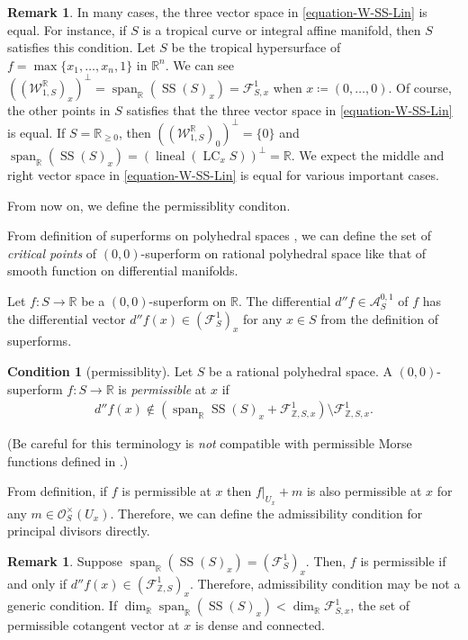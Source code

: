 \documentclass[a4paper,dvipdfmx,reqno,12pt]{amsart}
\theoremstyle{definition}
\newtheorem{remark}[theorem]{Remark}
\newtheorem{condition}[theorem]{Condition}
\newcommand{\deq}{\coloneqq}
\newcommand{\opn}[1]{\operatorname{#1}}
\numberwithin{equation}{section}
\begin{document}
\begin{remark}
In many cases, the three vector space in 
\cref{equation-W-SS-Lin} is equal.
For instance, if $S$ is a tropical curve 
or integral affine manifold, 
then $S$ satisfies this condition.
Let $S$ be the tropical hypersurface of
$f=\max\{x_1,\ldots,x_n,1\}$ in $\mathbb{R}^{n}$. 
We can see
$((\mathcal{W}_{1,S}^{\mathbb{R}})_{x})^{\bot}=\opn{span}_{{\mathbb{R}}}(\opn{SS}(S)_x)=\mathcal{F}_{S,x}^{1}$
when $x\deq (0,\ldots,0)$. 
Of course, the other points in $S$ satisfies 
that the three vector space in 
\cref{equation-W-SS-Lin} is equal. If 
$S=\mathbb{R}_{\geq 0}$, then 
$((\mathcal{W}_{1,S}^{\mathbb{R}})_{0})^{\bot}=\{0\}$ and
$\opn{span}_{\mathbb{R}}(\opn{SS}(S)_x)=
(\opn{lineal}(\opn{LC}_x S))^{\bot}=\mathbb{R}$. 
We expect the middle and right vector space in 
\cref{equation-W-SS-Lin} is equal for various 
important cases.
\end{remark}

From now on, we define the permissiblity conditon.

From definition of superforms on 
polyhedral spaces 
\cite[Definition 2.10, 2.24]{MR3903579}, we 
can define the set of \emph{critical points} 
of $(0,0)$-superform on rational polyhedral space
like that of smooth function on differential
manifolds.


Let $f\colon S \to \mathbb{R}$ be a $(0,0)$-superform on 
$\mathbb{R}$. The differential $d''f\in \mathcal{A}^{0,1}_S$ of $f$ has the 
differential vector $d''f (x)\in (\mathcal{F}_{S}^{1})_x$ for any 
$x\in S$ from the definition of superforms.

\begin{condition}[{permissiblity}] \label{cond: permissible}
Let $S$ be a rational polyhedral space.
A $(0,0)$-superform $f\colon S \to {\mathbb{R}}$ is \emph{permissible} at $x$ 
if 
\begin{align}
d''f(x)\notin (\opn{span}_{{\mathbb{R}}}
\opn{SS}(S)_x+\mathcal{F}_{\mathbb{Z},S,x}^{1})
\setminus \mathcal{F}_{\mathbb{Z},S,x}^{1}.
\end{align}
\end{condition}

(Be careful for this terminology is \emph{not} 
compatible with permissible Morse functions defined 
in \cite[p.156]{MR1336822}.)

From definition, if $f$ is permissible at $x$ then
$f|_{U_x}+m$ is also permissible at $x$ for any 
$m\in \mathcal{O}_{S}^{\times}(U_x)$.
Therefore, we can define the admissibility condition
for principal divisors directly.
\begin{remark}
Suppose $\opn{span}_{\mathbb{R}}(\opn{SS}(S)_x)=(\mathcal{F}_{S}^{1})_x$. 
Then, $f$ is permissible if and only if 
$d''f(x)\in (\mathcal{F}_{\mathbb{Z},S}^{1})_x$.
Therefore, admissibility
condition may be not a generic condition.
If $\dim_{\mathbb{R}} \opn{span}_{{\mathbb{R}}}
(\opn{SS}(S)_x)<\dim_{\mathbb{R}} \mathcal{F}_{S,x}^{1}$, the 
set of permissible cotangent vector at $x$ is dense and 
connected.
\end{remark}
\end{document}
